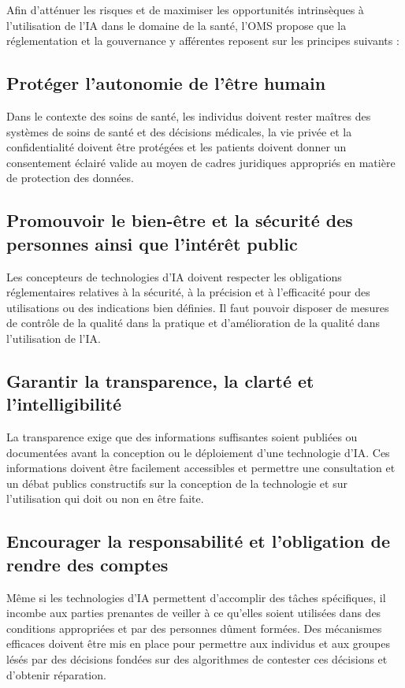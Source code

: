 Afin d'atténuer les risques et de maximiser les opportunités
intrinsèques à l'utilisation de l'IA dans le domaine de la santé,
l'OMS propose que la réglementation et la gouvernance y afférentes
reposent sur les principes suivants :

\subsection{Protéger l'autonomie de l'être humain}
Dans le contexte des soins de santé, les individus doivent rester
maîtres des systèmes de soins de santé et des décisions médicales,
la vie privée et la confidentialité doivent être protégées et les
patients doivent donner un consentement éclairé valide au moyen de
cadres juridiques appropriés en matière de protection des données.

\subsection{Promouvoir le bien-être et la sécurité des personnes ainsi que l'intérêt public}
Les concepteurs de technologies d'IA doivent respecter les obligations
réglementaires relatives à la sécurité, à la précision et à l'efficacité pour
des utilisations ou des indications bien définies. Il faut pouvoir disposer de
mesures de contrôle de la qualité dans la pratique et d'amélioration de la
qualité dans l'utilisation de l'IA.

\subsection{Garantir la transparence, la clarté et l'intelligibilité}
La transparence exige que des informations suffisantes soient publiées ou
documentées avant la conception ou le déploiement d'une technologie d'IA. Ces
informations doivent être facilement accessibles et permettre une consultation
et un débat publics constructifs sur la conception de la technologie et sur
l'utilisation qui doit ou non en être faite.

\subsection{Encourager la responsabilité et l'obligation de rendre des comptes}
Même si les technologies d'IA permettent d'accomplir des tâches spécifiques, il
incombe aux parties prenantes de veiller à ce qu'elles soient utilisées dans
des conditions appropriées et par des personnes dûment formées. Des mécanismes
efficaces doivent être mis en place pour permettre aux individus et aux groupes
lésés par des décisions fondées sur des algorithmes de contester ces décisions
et d'obtenir réparation.

